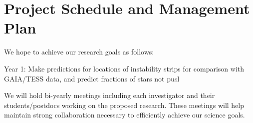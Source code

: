\section{Project Schedule and Management Plan}

We hope to achieve our research goals as follows:

Year 1: Make predictions for locations of instability strips for comparison with GAIA/TESS data, and predict fractions of stars not pusl 

We will  hold bi-yearly meetings including each investigator and their students/postdocs working on the proposed research. These meetings will help maintain strong collaboration necessary to efficiently achieve our science goals.
